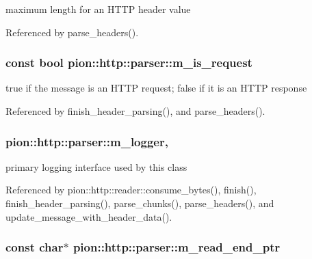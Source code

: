 maximum length for an H\-T\-T\-P header value 



Referenced by parse\-\_\-headers().

\hypertarget{classpion_1_1http_1_1parser_a5c24acf28ddd9c6133be4aa3127da530}{
\subsubsection[{m\-\_\-is\-\_\-request}]{\setlength{\rightskip}{0pt plus 5cm}const bool pion\-::http\-::parser\-::m\-\_\-is\-\_\-request\hspace{0.3cm}{\ttfamily [protected]}}}\label{classpion_1_1http_1_1parser_a5c24acf28ddd9c6133be4aa3127da530}


true if the message is an H\-T\-T\-P request; false if it is an H\-T\-T\-P response 



Referenced by finish\-\_\-header\-\_\-parsing(), and parse\-\_\-headers().

\hypertarget{classpion_1_1http_1_1parser_ac0df021ba559d1af96dc9b0a5fa99df5}{
\subsubsection[{m\-\_\-logger}]{ pion\-::http\-::parser\-::m\-\_\-logger\hspace{0.3cm}{\ttfamily [mutable]}, {\ttfamily [protected]}}}\label{classpion_1_1http_1_1parser_ac0df021ba559d1af96dc9b0a5fa99df5}


primary logging interface used by this class 



Referenced by pion\-::http\-::reader\-::consume\-\_\-bytes(), finish(), finish\-\_\-header\-\_\-parsing(), parse\-\_\-chunks(), parse\-\_\-headers(), and update\-\_\-message\-\_\-with\-\_\-header\-\_\-data().

\hypertarget{classpion_1_1http_1_1parser_a6788da854f2d77ae2c92c739d0a2c191}{
\subsubsection[{m\-\_\-read\-\_\-end\-\_\-ptr}]{\setlength{\rightskip}{0pt plus 5cm}const char$\ast$ pion\-::http\-::parser\-::m\-\_\-read\-\_\-end\-\_\-ptr\hspace{0.3cm}{\ttfamily [protected]}}}\label{classpion_1_1http_1_1parser_a6788da854f2d77ae2c92c739d0a2c191}



